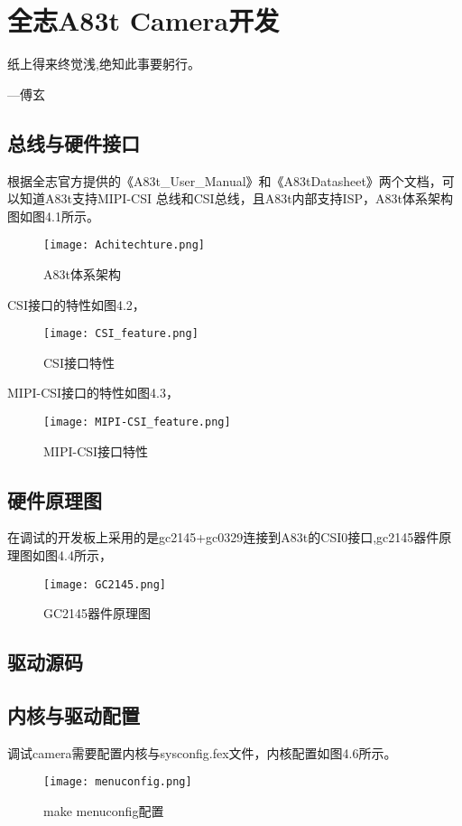 \chapter{全志A83t Camera开发}
\begin{center}
纸上得来终觉浅,绝知此事要躬行。
\end{center}

\begin{flushright}
---傅玄
\end{flushright}

\section{总线与硬件接口}

根据全志官方提供的《A83t\_User\_Manual》和《A83t\-Datasheet》两个文档，可以知道A83t支持MIPI-CSI
总线和CSI总线，且A83t内部支持ISP，A83t体系架构图如图4.1所示。

\begin{figure}[!hbtp]
\centering
\texttt{[image: Achitechture.png]}
\caption{A83t体系架构\label{figur:A83t_Achitechture}}
\end{figure}

CSI接口的特性如图4.2，
\begin{figure}[H]
\centering
\texttt{[image: CSI\_feature.png]}
\caption{CSI接口特性\label{figur:CSI_feature}}
\end{figure}

MIPI-CSI接口的特性如图4.3，
\begin{figure}[H]
\centering
\texttt{[image: MIPI-CSI\_feature.png]}
\caption{MIPI-CSI接口特性\label{figur:MIPI-CSI_feature}}
\end{figure}


\section{硬件原理图}
在调试的开发板上采用的是gc2145+gc0329连接到A83t的CSI0接口,gc2145器件原理图如图4.4所示，
\begin{figure}[H]
\centering
\texttt{[image: GC2145.png]}
\caption{GC2145器件原理图\label{figur:GC2145}}
\end{figure}
\section{驱动源码}

\section{内核与驱动配置}
调试camera需要配置内核与sysconfig.fex文件，内核配置如图4.6所示。
\begin{figure}[H]
\centering
\texttt{[image: menuconfig.png]}
\caption{make menuconfig配置\label{figur:menuconfig}}
\end{figure}

